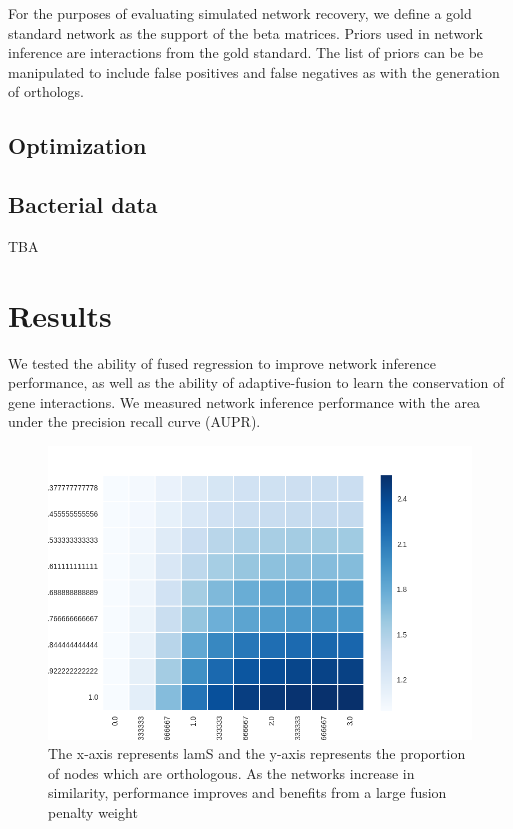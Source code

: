 \documentclass[11pt]{article}
\begin{document}
For the purposes of evaluating simulated network recovery, we define a gold standard network as the support of the beta matrices. Priors used in network inference are interactions from the gold standard. The list of priors can be be manipulated to include false positives and false negatives as with the generation of orthologs. 

\subsection{Optimization}

\subsection{Bacterial data}
TBA

\section{Results}
We tested the ability of fused regression to improve network inference performance, as well as the ability of adaptive-fusion to learn the conservation of gene interactions. We measured network inference performance with the area under the precision recall curve (AUPR). 

\begin{figure}
\begin{center}
  \includegraphics[scale=0.45]{l2fusionquick.png}
  \caption{\label{fig:figure1} The x-axis represents lamS and the y-axis represents the proportion of nodes which are orthologous. As the networks increase in similarity, performance improves and benefits from a large fusion penalty weight}
  \end{center}
\end{figure}
\end{document}
